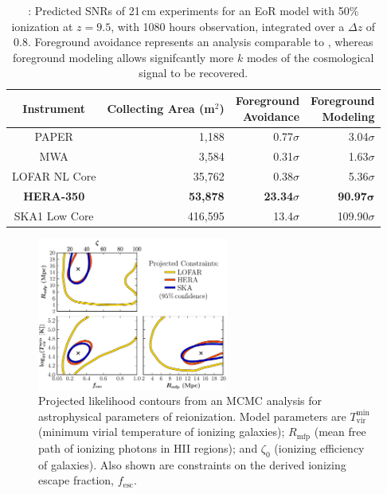 \documentclass[preprint,11pt]{aastex}
\newcommand{\Caption}[4]{\vspace{#1}\renewcommand{\baselinestretch}{#2}\caption{#4}\vspace{#3}}
\begin{document}
\begin{table}
\caption{\hspace{-1.2mm}: Predicted SNRs of 21\,cm experiments for an EoR model with 50\% ionization at $z=9.5$, with 1080 hours observation, integrated over a $\Delta z$ of $0.8$.
Foreground avoidance represents an analysis comparable to \cite{ali_et_al2015}, whereas foreground modeling allows signifcantly more $k$ modes of the cosmological signal to be recovered.}
\small
 \centering
 \begin{tabular}{c||r||r|r} 
\hline
Instrument & \shortstack{Collecting \\ Area (m$^2$)} & \shortstack{Foreground \\Avoidance} & \shortstack{Foreground \\Modeling} \\
\hline
PAPER & 1,188 & 0.77$\sigma$ & 3.04$\sigma$ \\
MWA & 3,584 & 0.31$\sigma$ & 1.63$\sigma$ \\
LOFAR NL Core & 35,762 & 0.38$\sigma$ & 5.36$\sigma$ \\
\textbf{HERA-350} & \textbf{53,878} & \textbf{23.34$\sigma$} & \textbf{90.97}$\boldsymbol{\sigma}$ \\
SKA1 Low Core & 416,595 & 13.4$\sigma$ & 109.90$\sigma$
\end{tabular}
\hspace{-0.1in}
\label{tab:signif}
\end{table}

\begin{figure}[h!]
\centering
    \includegraphics[width=0.56\textwidth,clip]{plots/LikelihoodContours_smaller_avoid_All3_no_table}
  \caption{Projected likelihood contours from an MCMC analysis for astrophysical parameters of reionization. Model parameters are $T_\textrm{vir}^\textrm{min}$ (minimum virial temperature of ionizing galaxies); $R_\textrm{mfp}$ (mean free path of ionizing photons in HII regions); and $\zeta_0$ (ionizing efficiency of galaxies).  Also shown are constraints on the derived ionizing escape fraction, $f_\textrm{esc}$. }
	\label{fig:paramConstraints}
\end{figure}
 
\end{document}
